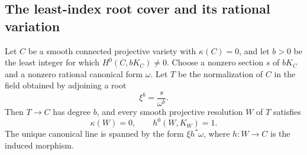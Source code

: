 \subsection{The least-index root cover and its rational variation}

\begin{lemma}
\label{altord:cb:root-cover}
Let \(C\) be a smooth connected projective variety with
\(\kappa(C)=0\), and let \(b>0\) be the least integer for which
\(H^0(C,bK_C)\ne0\).  Choose a nonzero section \(s\) of \(bK_C\) and a
nonzero rational canonical form \(\omega\).
Let \(T\) be the normalization of \(C\) in the field obtained by
adjoining a root
\[
 \xi^b=\frac{s}{\omega^b}.
\]
Then \(T\to C\) has degree \(b\), and every smooth projective
resolution \(W\) of \(T\) satisfies
\[
 \kappa(W)=0,\qquad h^0(W,K_W)=1.
\]
The unique canonical line is spanned by the form
\(\xi h^*\omega\), where \(h:W\to C\) is the induced morphism.
\end{lemma}

